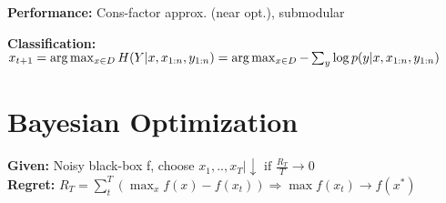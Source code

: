\textbf{Performance:} Cons-factor approx. (near opt.), submodular
\begin{comment}
	\textbf{Proof:} Via submodularity...\
\end{comment}

\textbf{Classification:} $x_{t+1} = \arg \max_{x \in D} H(Y|x,x_{1:n}, y_{1:n})\\
= \arg \max_{x \in D} -\sum_y \log p(y| x,x_{1:n}, y_{1:n})$\\
\begin{comment}
	\textbf{Intuition, heteroscedastic case:} The most uncertain label is not necessarily the most informative. If we have binary classification, the point closest to the division boundary are chosen.\\ 
	But, those are also the points with the largest variance (aleatoric noise), since they are farthest away from the "source" cluster. So if the aleatoric noise is high, the decision boundary might choose weird points and don't get a proper fit.\\
\end{comment}

\section{Bayesian Optimization}
\begin{comment}
	For example synthesizing molecules or choosing hyperparameters of neural networks, we want some kind of process to derive the next parameters to try out.
	The evaluation of the parameters is very expensive.\\
	\textbf{Tradeoff:} Exploitation vs. exploration. We don't want to make experience with clearly suboptimal results, so we need to balance these two factors.\\
	\textbf{Key Idea:} Learn an approximate model of a blackbox function, which then can be used to plan what samples to take next. The samples we get are noisy: $y_t = f(x_t) + \epsilon_t$.\\
	\textbf{Goal:} How to sequentially pick x's to find $\max_x f(x)$ with minimal samples. Find an aquisition function that does this.\\
\end{comment}
\textbf{Given:} Noisy  black-box f, choose $x_1,..,x_T| \downarrow \text{ if } \frac{R_T}{T} \rightarrow 0 $\\
\textbf{Regret:} $R_T = \sum_t^T(\max_x f(x) - f(x_t)) \Rightarrow \max f(x_t) \rightarrow f(x^*)$\\
\begin{comment}
	Given a set of possible inputs D, and noisy blackbox function f, choose $x_s$ and observe $y_t = f(x_t) + \epsilon_t$.\\
	The cumulative regret tells us the error if we knew the maximum in advance. It has to go to zero over time, to reach the actual maximum.\\
	Algorithms have regret bounds, which jufge the effectiveness of an algorithm.\\
\end{comment}

